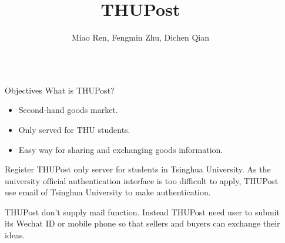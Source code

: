 \documentclass[final]{beamer}
\title{THUPost} %
\author{Miao Ren, Fengmin Zhu, Dichen Qian} %
\institute{2016} %
\newlength{\sepwid}
\newlength{\onecolwid}
\begin{document}

\setlength{\belowcaptionskip}{2ex} %
\setlength\belowdisplayshortskip{2ex} %

\begin{frame}[t] %

\begin{columns}[t] %

\begin{column}{\sepwid}\end{column} %

\begin{column}{\onecolwid} %


\begin{alertblock}{Objectives}
What is THUPost?
\begin{itemize}
\item Second-hand goods market.
\item Only served for THU students.
\item Easy way for sharing and exchanging goods information.
\end{itemize}

\end{alertblock}


\begin{block}{Register}
THUPost only server for students in Tsinghua University. As the university official authentication interface is too difficult to apply, THUPost use email of Tsinghua University to make authentication.

THUPost don't supply mail function. Instead THUPost need user to submit its Wechat ID or mobile phone so that sellers and buyers can exchange their ideas.


\end{block}
\end{column}
\end{columns}
\end{frame}
\end{document}
